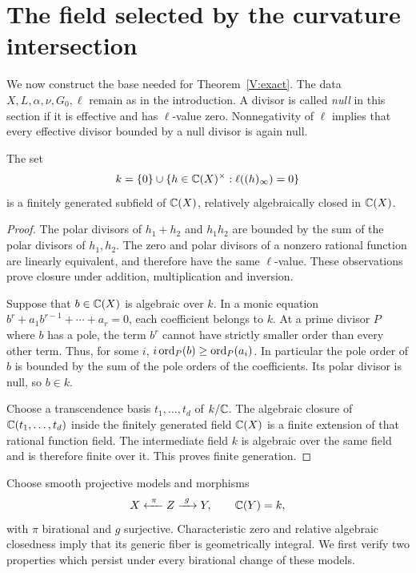 \section{The field selected by the curvature intersection}
\label{V:null-field}

We now construct the base needed for Theorem~\ref{V:exact}. The data
$X,L,\alpha,\nu,G_0,\ell$ remain as in the introduction. A divisor
is called \emph{null} in this section if it is effective and has
$\ell$-value zero. Nonnegativity of $\ell$ implies that every effective
divisor bounded by a null divisor is again null.

\begin{lemma}\label{V:polar-field}
The set
\[
 k=\{0\}\cup\{h\in\mathbb C(X)^\times:\ell((h)_\infty)=0\}
\]
is a finitely generated subfield of $\mathbb C(X)$, relatively algebraically
closed in $\mathbb C(X)$.
\end{lemma}
\begin{proof}
The polar divisors of $h_1+h_2$ and $h_1h_2$ are bounded by the sum
of the polar divisors of $h_1,h_2$. The zero and polar divisors of a
nonzero rational function are linearly equivalent, and therefore have
the same $\ell$-value. These observations prove closure under addition,
multiplication and inversion.

Suppose that $b\in\mathbb C(X)$ is algebraic over $k$. In a monic equation
$b^r+a_1b^{r-1}+\cdots+a_r=0$, each coefficient belongs to $k$.
At a prime divisor $P$ where $b$ has a pole, the term $b^r$ cannot
have strictly smaller order than every other term. Thus, for some $i$,
$i\operatorname{ord}_P(b)\ge\operatorname{ord}_P(a_i)$. In particular the pole order of $b$
is bounded by the sum of the pole orders of the coefficients. Its polar
divisor is null, so $b\in k$.

Choose a transcendence basis $t_1,\ldots,t_d$ of $k/\mathbb C$.
The algebraic closure of $\mathbb C(t_1,\ldots,t_d)$ inside the finitely
generated field $\mathbb C(X)$ is a finite extension of that rational function
field. The intermediate field $k$ is algebraic over the same field
and is therefore finite over it. This proves finite generation.
\end{proof}

Choose smooth projective models and morphisms
\[
 X\xleftarrow{\ \pi\ } Z\xrightarrow{\ g\ }Y,
 \qquad \mathbb C(Y)=k,
\]
with $\pi$ birational and $g$ surjective. Characteristic zero and relative
algebraic closedness imply that its generic fiber is geometrically
integral. We first verify two properties which persist under every
birational change of these models.

